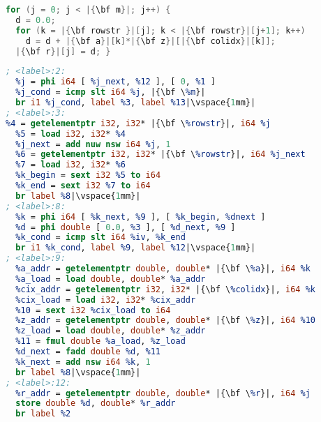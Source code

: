 \begin{lstlisting}[escapechar=|,language=C,basicstyle=\linespread{0.75}\small\ttfamily]
for (j = 0; j < |{\bf m}|; j++) {
  d = 0.0;
  for (k = |{\bf rowstr }|[j]; k < |{\bf rowstr}|[j+1]; k++)
    d = d + |{\bf a}|[k]*|{\bf z}|[|{\bf colidx}|[k]];
  |{\bf r}|[j] = d; }
\end{lstlisting}
\vspace{-1em}
\begin{lstlisting}[language={LLVM},escapechar=|,basicstyle=\linespread{0.8}\tiny\ttfamily,
                   label={fig:spmvexample1},caption={Sparse linear algebra in C and LLVM IR}]
; <label>:2:
  %j = phi i64 [ %j_next, %12 ], [ 0, %1 ]
  %j_cond = icmp slt i64 %j, |{\bf \%m}|
  br i1 %j_cond, label %3, label %13|\vspace{1mm}|
; <label>:3:
%4 = getelementptr i32, i32* |{\bf \%rowstr}|, i64 %j
  %5 = load i32, i32* %4
  %j_next = add nuw nsw i64 %j, 1
  %6 = getelementptr i32, i32* |{\bf \%rowstr}|, i64 %j_next
  %7 = load i32, i32* %6
  %k_begin = sext i32 %5 to i64
  %k_end = sext i32 %7 to i64
  br label %8|\vspace{1mm}|
; <label>:8:
  %k = phi i64 [ %k_next, %9 ], [ %k_begin, %dnext ]
  %d = phi double [ 0.0, %3 ], [ %d_next, %9 ]
  %k_cond = icmp slt i64 %iv, %k_end
  br i1 %k_cond, label %9, label %12|\vspace{1mm}|
; <label>:9:
  %a_addr = getelementptr double, double* |{\bf \%a}|, i64 %k
  %a_load = load double, double* %a_addr
  %cix_addr = getelementptr i32, i32* |{\bf \%colidx}|, i64 %k
  %cix_load = load i32, i32* %cix_addr
  %10 = sext i32 %cix_load to i64
  %z_addr = getelementptr double, double* |{\bf \%z}|, i64 %10
  %z_load = load double, double* %z_addr
  %11 = fmul double %a_load, %z_load
  %d_next = fadd double %d, %11
  %k_next = add nsw i64 %k, 1
  br label %8|\vspace{1mm}|
; <label>:12:
  %r_addr = getelementptr double, double* |{\bf \%r}|, i64 %j
  store double %d, double* %r_addr
  br label %2
\end{lstlisting}
\vspace{-0.287cm}

